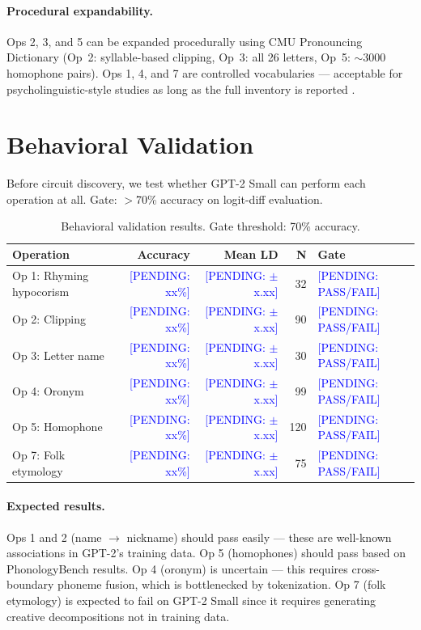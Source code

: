 \documentclass[11pt,a4paper]{article}
\newcommand{\PENDING}[1]{\textcolor{blue}{[PENDING: #1]}}
\begin{document}
\paragraph{Procedural expandability.}
Ops 2, 3, and 5 can be expanded procedurally using CMU Pronouncing Dictionary
(Op~2: syllable-based clipping, Op~3: all 26 letters, Op~5: $\sim$3000
homophone pairs). Ops 1, 4, and 7 are controlled vocabularies --- acceptable
for psycholinguistic-style studies as long as the full inventory is reported
\citep{warstadt2020blimp}.

\section{Behavioral Validation}

Before circuit discovery, we test whether GPT-2 Small can perform each
operation at all. Gate: $>$70\% accuracy on logit-diff evaluation.

\begin{table}[h!]
\centering
\caption{Behavioral validation results. Gate threshold: 70\% accuracy.}
\label{tab:behavioral}
\small
\begin{tabular}{lrrrl}
\toprule
\textbf{Operation} & \textbf{Accuracy} & \textbf{Mean LD} & \textbf{N} & \textbf{Gate} \\
\midrule
Op 1: Rhyming hypocorism   & \PENDING{xx\%} & \PENDING{$\pm$x.xx} & 32  & \PENDING{PASS/FAIL} \\
Op 2: Clipping             & \PENDING{xx\%} & \PENDING{$\pm$x.xx} & 90  & \PENDING{PASS/FAIL} \\
Op 3: Letter name          & \PENDING{xx\%} & \PENDING{$\pm$x.xx} & 30  & \PENDING{PASS/FAIL} \\
Op 4: Oronym               & \PENDING{xx\%} & \PENDING{$\pm$x.xx} & 99  & \PENDING{PASS/FAIL} \\
Op 5: Homophone            & \PENDING{xx\%} & \PENDING{$\pm$x.xx} & 120 & \PENDING{PASS/FAIL} \\
Op 7: Folk etymology       & \PENDING{xx\%} & \PENDING{$\pm$x.xx} & 75  & \PENDING{PASS/FAIL} \\
\bottomrule
\end{tabular}
\end{table}

\paragraph{Expected results.}
Ops 1 and 2 (name $\to$ nickname) should pass easily --- these are well-known
associations in GPT-2's training data. Op 5 (homophones) should pass based on
PhonologyBench results. Op 4 (oronym) is uncertain --- this requires
cross-boundary phoneme fusion, which is bottlenecked by tokenization. Op 7
(folk etymology) is expected to fail on GPT-2 Small since it requires
generating creative decompositions not in training data.
\end{document}
